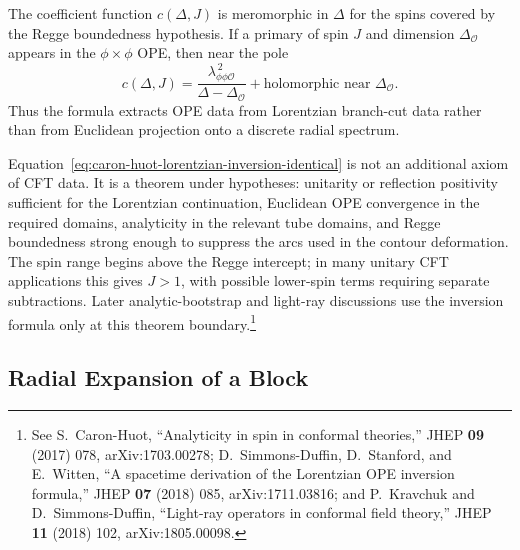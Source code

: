 The coefficient function \(c(\Delta,J)\) is meromorphic in \(\Delta\) for the
spins covered by the Regge boundedness hypothesis.  If a primary of spin \(J\)
and dimension \(\Delta_{\mathcal O}\) appears in the \(\phi\times\phi\) OPE,
then near the pole
\begin{equation}
  c(\Delta,J)
  =
  \frac{\lambda_{\phi\phi\mathcal O}^{\,2}}
       {\Delta-\Delta_{\mathcal O}}
  +\text{holomorphic near }\Delta_{\mathcal O}.
  \label{eq:lorentzian-inversion-pole-extraction}
\end{equation}
Thus the formula extracts OPE data from Lorentzian branch-cut data rather than
from Euclidean projection onto a discrete radial spectrum.

\begin{remark}
\label{rem:lorentzian-inversion-scope}
Equation~\eqref{eq:caron-huot-lorentzian-inversion-identical} is not an
additional axiom of CFT data.  It is a theorem under hypotheses: unitarity or
reflection positivity sufficient for the Lorentzian continuation, Euclidean OPE
convergence in the required domains, analyticity in the relevant tube domains,
and Regge boundedness strong enough to suppress the arcs used in the contour
deformation.  The spin range begins above the Regge intercept; in many unitary
CFT applications this gives \(J>1\), with possible lower-spin terms requiring
separate subtractions.  Later analytic-bootstrap and light-ray discussions use
the inversion formula only at this theorem boundary.\footnote{See
S.~Caron-Huot, ``Analyticity in spin in conformal theories,'' JHEP
\textbf{09} (2017) 078, arXiv:1703.00278; D.~Simmons-Duffin,
D.~Stanford, and E.~Witten, ``A spacetime derivation of the Lorentzian OPE
inversion formula,'' JHEP \textbf{07} (2018) 085, arXiv:1711.03816; and
P.~Kravchuk and D.~Simmons-Duffin, ``Light-ray operators in conformal field
theory,'' JHEP \textbf{11} (2018) 102, arXiv:1805.00098.}
\end{remark}

\subsection{Radial Expansion of a Block}


